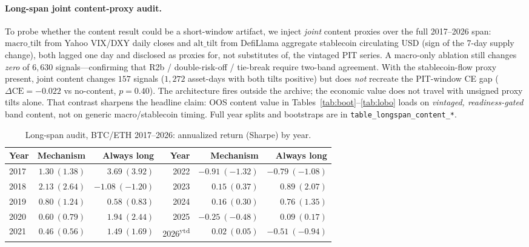 \documentclass[12pt]{article}
\begin{document}
\paragraph{Long-span joint content-proxy audit.}
To probe whether the content result could be a short-window artifact, we inject \emph{joint} content proxies over the full 2017--2026 span: $\mathrm{macro\_tilt}$ from Yahoo VIX/DXY daily closes and $\mathrm{alt\_tilt}$ from DefiLlama aggregate stablecoin circulating USD (sign of the 7-day supply change), both lagged one day and disclosed as proxies for, not substitutes of, the vintaged PIT series. A macro-only ablation still changes \emph{zero} of $6{,}630$ signals---confirming that R2b / double-risk-off / tie-break require two-band agreement. With the stablecoin-flow proxy present, joint content changes $157$ signals ($1{,}272$ asset-days with both tilts positive) but does \emph{not} recreate the PIT-window CE gap ($\Delta\mathrm{CE}=-0.022$ vs no-content, $p=0.40$). The architecture fires outside the archive; the economic value does not travel with unsigned proxy tilts alone. That contrast sharpens the headline claim: OOS content value in Tables~\ref{tab:boot}--\ref{tab:lobo} loads on \emph{vintaged, readiness-gated} band content, not on generic macro/stablecoin timing. Full year splits and bootstraps are in \texttt{table\_longspan\_content\_*}.

\begin{table}[t]
\centering
\caption{Long-span audit, BTC/ETH 2017--2026: annualized return (Sharpe) by year.}
\label{tab:longspan}
\begin{tabular}{lrrrrr}
\toprule
Year & Mechanism & Always long & Year & Mechanism & Always long \\
\midrule
2017 & $1.30\ (1.38)$ & $3.69\ (3.92)$ & 2022 & $-0.91\ (-1.32)$ & $-0.79\ (-1.08)$ \\
2018 & $2.13\ (2.64)$ & $-1.08\ (-1.20)$ & 2023 & $0.15\ (0.37)$ & $0.89\ (2.07)$ \\
2019 & $0.80\ (1.24)$ & $0.58\ (0.83)$ & 2024 & $0.16\ (0.30)$ & $0.76\ (1.35)$ \\
2020 & $0.60\ (0.79)$ & $1.94\ (2.44)$ & 2025 & $-0.25\ (-0.48)$ & $0.09\ (0.17)$ \\
2021 & $0.46\ (0.56)$ & $1.49\ (1.69)$ & 2026\textsuperscript{ytd} & $0.02\ (0.05)$ & $-0.51\ (-0.94)$ \\
\bottomrule
\end{tabular}
\end{table}
\end{document}
